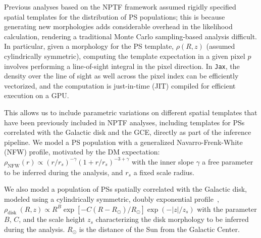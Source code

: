 \documentclass{article}
\newcommand{\ys}[1]{\textcolor{blue}{[YS: #1]}}
\theoremstyle{plain}
\theoremstyle{definition}
\theoremstyle{remark}
\begin{document}
Previous analyses based on the NPTF framework assumed rigidly specified spatial templates for the distribution of PS populations; this is because generating new morphologies adds considerable overhead in the likelihood calculation, rendering a traditional Monte Carlo sampling-based analysis difficult. In particular, given a morphology for the PS template, $\rho(R, z)$ (assumed cylindrically symmetric), computing the template expectation in a given pixel $p$ involves performing a line-of-sight integral in the pixel direction.
In \texttt{Jax}, the density over the line of sight as well across the pixel index can be efficiently vectorized, and the computation is just-in-time (JIT) compiled for efficient execution on a GPU.

This allows us to include parametric variations on different spatial templates that have been previously included in NPTF analyses, including templates for PSs correlated with the Galactic disk and the GCE, directly as part of the inference pipeline. We model a PS population with a generalized Navarro-Frenk-White (NFW) profile, motivated by the DM expectation:
$\rho_{\mathrm{NFW}}(r) \propto\left({r}/{r_s}\right)^{-\gamma}\left(1+{r}/{r_s}\right)^{-3+\gamma}$ with the inner slope $\gamma$ a free parameter to be inferred during the analysis, and $r_s$ a fixed scale radius.

We also model a population of PSs spatially correlated with the Galactic disk, modeled using a cylindrically symmetric, doubly exponential profile~\cite{bartels2018bayesian,lorimer2006parkes}, $\rho_{\text {disk }}(R, z) \propto {R}^B\exp \left[-C\left({R-R_{\odot}}\right)/{R_\odot}\right] \exp \left(-{|z|}/{z_s}\right)$ with the parameter $B$, $C$, and the scale height $z_s$ characterizing the disk morphology to be inferred during the analysis. $R_{\odot}$ is the distance of the Sun from the Galactic Center. %
\end{document}
